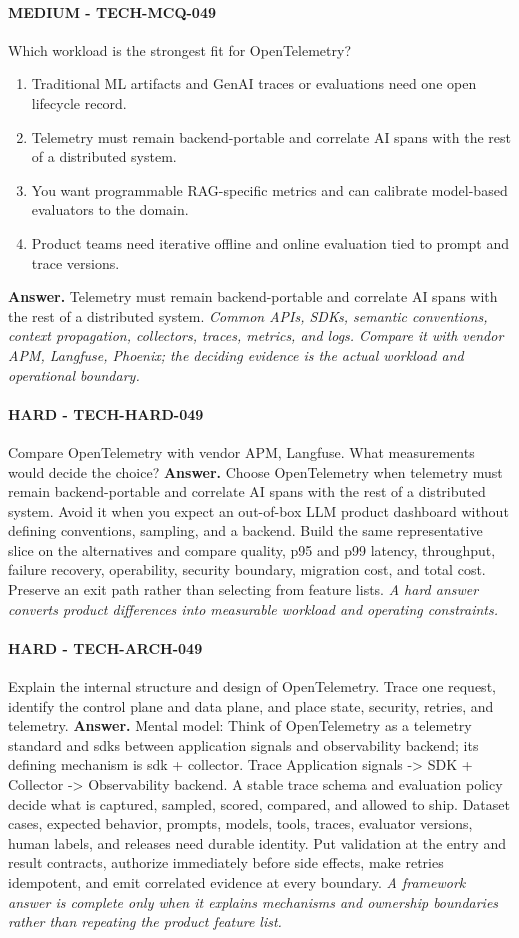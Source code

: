 \paragraph{MEDIUM - TECH-MCQ-049} Which workload is the strongest fit for OpenTelemetry?
\begin{enumerate}[label=\Alph*.]
\item Traditional ML artifacts and GenAI traces or evaluations need one open lifecycle record.
\item Telemetry must remain backend-portable and correlate AI spans with the rest of a distributed system.
\item You want programmable RAG-specific metrics and can calibrate model-based evaluators to the domain.
\item Product teams need iterative offline and online evaluation tied to prompt and trace versions.
\end{enumerate}
\textbf{Answer.} Telemetry must remain backend-portable and correlate AI spans with the rest of a distributed system.
\textit{Common APIs, SDKs, semantic conventions, context propagation, collectors, traces, metrics, and logs. Compare it with vendor APM, Langfuse, Phoenix; the deciding evidence is the actual workload and operational boundary.}
\paragraph{HARD - TECH-HARD-049} Compare OpenTelemetry with vendor APM, Langfuse. What measurements would decide the choice?
\textbf{Answer.} Choose OpenTelemetry when telemetry must remain backend-portable and correlate AI spans with the rest of a distributed system. Avoid it when you expect an out-of-box LLM product dashboard without defining conventions, sampling, and a backend. Build the same representative slice on the alternatives and compare quality, p95 and p99 latency, throughput, failure recovery, operability, security boundary, migration cost, and total cost. Preserve an exit path rather than selecting from feature lists.
\textit{A hard answer converts product differences into measurable workload and operating constraints.}
\paragraph{HARD - TECH-ARCH-049} Explain the internal structure and design of OpenTelemetry. Trace one request, identify the control plane and data plane, and place state, security, retries, and telemetry.
\textbf{Answer.} Mental model: Think of OpenTelemetry as a telemetry standard and sdks between application signals and observability backend; its defining mechanism is sdk + collector. Trace Application signals -> SDK + Collector -> Observability backend. A stable trace schema and evaluation policy decide what is captured, sampled, scored, compared, and allowed to ship. Dataset cases, expected behavior, prompts, models, tools, traces, evaluator versions, human labels, and releases need durable identity. Put validation at the entry and result contracts, authorize immediately before side effects, make retries idempotent, and emit correlated evidence at every boundary.
\textit{A framework answer is complete only when it explains mechanisms and ownership boundaries rather than repeating the product feature list.}

